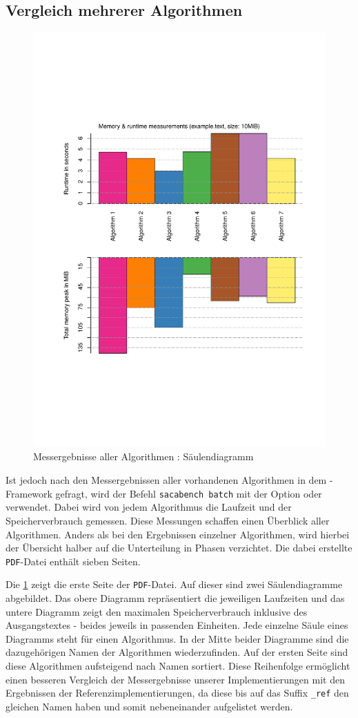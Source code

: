 \subsection{Vergleich mehrerer Algorithmen}
\label{framework:bechmark:sacabench-batch}

\begin{figure}
	\includegraphics[page = 1, width=.5\textwidth]{kapitel/framework/benchmark/sacabench-batch/beispiel_batch_saeule.pdf}
	\caption{Messergebnisse aller Algorithmen : Säulendiagramm}
	\label{pdf:benchmark:batch:saeule}
\end{figure}

Ist jedoch nach den Messergebnissen aller vorhandenen Algorithmen in dem \sacabench-Framework gefragt, wird der Befehl \texttt{sacabench batch} mit der Option  oder  verwendet. Dabei wird von jedem Algorithmus die Laufzeit und der Spei\-cher\-ver\-brauch gemessen. Diese Messungen schaffen einen Überblick aller Algorithmen. Anders als bei den Ergebnissen einzelner Algorithmen, wird hierbei der Übersicht halber auf die Unterteilung in Phasen verzichtet. Die dabei erstellte \texttt{PDF}-Datei enthält sieben Seiten.

Die \cref{pdf:benchmark:batch:saeule} zeigt die erste Seite der \texttt{PDF}-Datei. Auf dieser sind zwei Säulendiagramme abgebildet. Das obere Diagramm repräsentiert die jeweiligen Laufzeiten und das untere Diagramm zeigt den maximalen Spei\-cher\-ver\-brauch inklusive des Ausgangstextes - beides jeweils in passenden Einheiten. Jede einzelne Säule eines Diagramms steht für einen Algorithmus. In der Mitte beider Diagramme sind die dazugehörigen Namen der Algorithmen wiederzufinden. Auf der ersten Seite sind diese Algorithmen aufsteigend nach Namen sortiert. Diese Reihenfolge ermöglicht einen besseren Vergleich der Messergebnisse unserer Implementierungen mit den Ergebnissen der Referenzimplementierungen, da diese bis auf das Suffix \texttt{\_ref} den gleichen Namen haben und somit nebeneinander aufgelistet werden.

